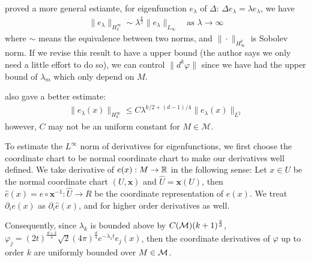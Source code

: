 \cite{xu2005asymptotic} proved a more general estiamte, for eigenfunction $e_\lambda$ of $\Delta$: $\Delta e_\lambda =\lambda e_\lambda$, we have 
\begin{align}
	\|e_\lambda\|_{H^\infty_k}\sim \lambda^\frac{k}{2} \|e_\lambda\|_{L_\infty} \quad \text{as }\lambda \rightarrow \infty
\end{align}
where $\sim$ means the equivalence between two norms, and $\|\cdot\|_{H^k_\infty}$ is Sobolev norm. If we revise this result to have a upper bound (the author says we only need a little effort to do so), we can control $\|d^k \varphi\|$ since we have had the upper bound of $\lambda_m$ which only depend on $M$.

\cite{2004Xuhigherorder} also gave a better estimate:
\begin{align}
	\|e_\lambda(x)\|_{H^\infty_k} \leq C \lambda^{k/2+(d-1)/4}\|e_\lambda(x)\|_{L^2}
\end{align}
however, $C$ may not be an uniform constant for $M \in \mathcal{M}$.


To estimate the $L^\infty$ norm of derivatives for eigenfunctions, we first choose the coordinate chart to be normal coordinate chart to make our derivatives well defined. We take derivative of $e(x): M \rightarrow \mathbb{R}$ in the following sense: Let $x \in U$ be the normal coordinate chart $(U,\textbf{x})$ and $\hat{U}=\textbf{x}(U)$, then $\hat{e}(x)=e\circ \textbf{x}^{-1}:\hat{U}\rightarrow R$ be the coordinate representation of $e(x)$. We treat $\partial_i e(x)$ as $\partial_i \hat{e}(x)$, and for higher order derivatives as well.

 Consequently, since $\lambda_k$ is bounded above by $C(\mathcal{M})(k+1)^\frac{2}{d}$, $\varphi_j = (2t)^\frac{d+2}{4}\sqrt{2}(4\pi)^\frac{d}{4}e^{-\lambda_1 t}e_j(x)$, then the coordinate derivatives of $\varphi$ up to order $k$ are uniformly bounded over $M \in \mathcal{M}$.

